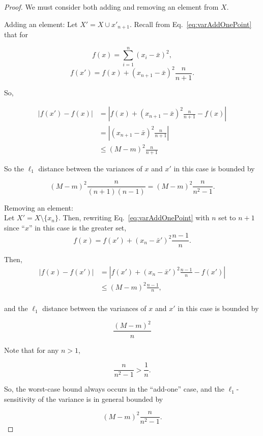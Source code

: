 \documentclass[11pt]{scrartcl} %
\begin{document}
 \begin{proof}
 	We must consider both adding and removing an element from $X$. \newline

 	Adding an element: \newline
 	Let $X' = X \cup x'_{n+1}$. Recall from Eq.~\ref{eq:varAddOnePoint} that for 
	
	$$ f(x) = \sum_{i=1}^n (x_i - \bar{x})^2, $$
	$$ f(x') = f(x) + (x_{n+1} - \bar{x})^2 \frac{n}{n+1}.$$ 
	
	So,
	
	\begin{align*}
	\left\vert f(x') - f(x) \right\vert &= \left\vert f(x) + (x_{n+1} - \bar{x})^2 \frac{n}{n+1} - f(x) \right\vert \\
		&= \left\vert (x_{n+1} - \bar{x})^2 \frac{n}{n+1} \right\vert \\
		&\le \left( M-m \right)^2 \frac{n}{n+1}
	\end{align*}
	
	So the $\ell_1$ distance between the variances of $x$ and $x'$ in this case is bounded by
	
	$$ \left( M-m \right)^2 \frac{n}{(n+1)(n-1)} = \left( M-m \right)^2 \frac{n}{n^2 - 1}.$$ 
	
	Removing an element: \\
	Let $X' = X \setminus \{x_n\}$. Then, rewriting Eq.~\ref{eq:varAddOnePoint} with $n$ set to $n+1$ since ``$x$'' in this case is the greater set,
	$$ f(x) = f(x') + (x_n - \bar{x}')^2 \frac{n-1}{n}.$$
	
	Then,
	\begin{align*}
	\left\vert f(x) - f(x') \right\vert &= \left\vert f(x') + (x_n - \bar{x}')^2 \frac{n-1}{n} - f(x') \right\vert \\
		&\le (M-m)^2 \frac{n-1}{n},\\
	\end{align*}
	
	and the $\ell_1$ distance between the variances of $x$ and $x'$ in this case is bounded by 
	
	$$\frac{(M-m)^2}{n}$$
	
	Note that for any $n > 1$, 
	
	$$ \frac{n}{n^2 - 1} > \frac{1}{n}.$$
	
	So, the worst-case bound always occurs in the ``add-one'' case, and the $\ell_1$-sensitivity of the variance is in general bounded by
	
	$$ \left( M-m \right)^2 \frac{n}{n^2 - 1}.$$
	

\end{proof}
\end{document}
